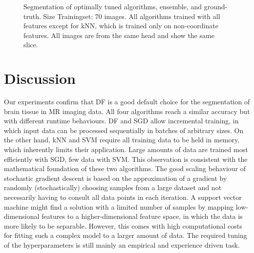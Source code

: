 \documentclass[journal]{IEEEtran}
\begin{document}
\begin{figure}[h!]
	\hfill
	\hfill
	\caption{Segmentation of optimally tuned algorithms, ensemble, and ground-truth. Size Trainingset: 70 images. All algorithms trained with all features except for kNN, which is trained only on non-coordinate features. All images are from the same head and show the same slice.}
	\label{f.slices_all}
\end{figure}

\section{Discussion}

Our experiments confirm that DF is a good default choice for the segmentation of brain tissue in MR imaging data. All four algorithms reach a similar accuracy but with different runtime behaviours. DF and SGD allow incremental training, in which input data can be processed sequentially in batches of arbitrary sizes. On the other hand, kNN and SVM require all training data to be held in memory, which inherently limits their application. Large amounts of data are trained most efficiently with SGD, few data with SVM. This observation is consistent with the mathematical foundation of these two algorithms. The good scaling behaviour of stochastic gradient descent is based on the approximation of a gradient by randomly (stochastically) choosing samples from a large dataset and not necessarily having to consult all data points in each iteration. A support vector machine might find a solution with a limited number of samples by mapping low-dimensional features to a higher-dimensional feature space, in which the data is more likely to be separable. However, this comes with high computational costs for fitting such a complex model to a larger amount of data. The required tuning of the hyperparameters is still mainly an empirical and experience driven task.
\end{document}
